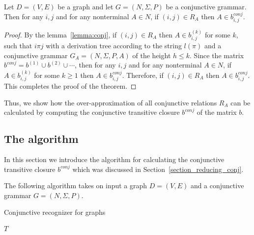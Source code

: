 \begin{mytheorem}\label{thm:correct_conj}
    Let $D = (V,E)$ be a graph and let $G =(N,\Sigma,P)$ be a conjunctive grammar. Then for any $i, j$ and for any nonterminal $A \in N$, if $(i,j) \in R_A$ then $A \in b^{conj}_{i,j}$.
\end{mytheorem}
\begin{proof}
    
    By the lemma~\ref{lemma:conj}, if $(i,j) \in R_A$ then $A \in b^{(k)}_{i,j}$ for some $k$, such that $i \pi j$ with a derivation tree according to the string $l(\pi)$ and a conjunctive grammar $G_A = (N,\Sigma,P,A)$ of the height $h \leq k$. Since the matrix $b^{conj} = b^{(1)} \cup b^{(2)} \cup \cdots$, then for any $i, j$ and for any nonterminal $A \in N$, if $A \in b^{(k)}_{i,j}$ for some $k \geq 1$ then  $A \in b^{conj}_{i,j}$. Therefore, if $(i,j) \in R_A$ then $A \in b^{conj}_{i,j}$. This completes the proof of the theorem.
\end{proof}

Thus, we show how the over-approximation of all conjunctive relations $R_A$ can be calculated by computing the conjunctive transitive closure $b^{conj}$ of the matrix $b$.



\subsection{The algorithm} \label{section_algorithm_conj}
In this section we introduce the algorithm for calculating the conjunctive transitive closure $b^{conj}$ which was discussed in Section~\ref{section_reducing_conj}.

The following algorithm takes on input a graph $D = (V, E)$ and a conjunctive grammar $G = (N,\Sigma,P)$.

\begin{algorithm}[H]
    \begin{algorithmic}[1]
        \caption{Conjunctive recognizer for graphs}
        \label{alg:graphParse_conj}
        
        \EndFor    
        
        \EndWhile
        \State \Return $T$    
        \EndFunction
    \end{algorithmic}
\end{algorithm}

